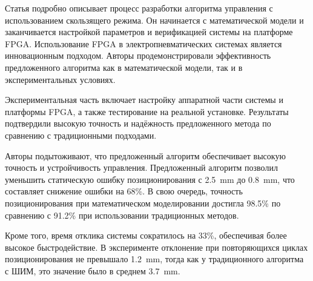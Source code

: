 Статья подробно описывает процесс разработки алгоритма управления с использованием скользящего режима.
Он начинается с математической модели и заканчивается настройкой параметров и верификацией системы на платформе FPGA.
Использование FPGA в электропневматических системах является инновационным подходом. Авторы продемонстрировали эффективность
предложенного алгоритма как в математической модели, так и в экспериментальных условиях.

Экспериментальная часть включает настройку аппаратной части системы и платформы FPGA, а также тестирование на реальной установке.
Результаты подтвердили высокую точность и надёжность предложенного метода по сравнению с традиционными подходами.

Авторы подытоживают, что предложенный алгоритм обеспечивает высокую точность и устройчивость управления.
Предложенный алгоритм позволил уменьшить статическую ошибку позиционирования с \num{2.5}~\si{\milli\metre} до \num{0.8}~\si{\milli\metre},
что составляет снижение ошибки на \num{68}\%.
В свою очередь, точность позиционирования при математическом моделировании достигла \num{98.5}\% по сравнению с \num{91.2}\% при
использовании традиционных методов.

Кроме того, время отклика системы сократилось на 33\%, обеспечивая более высокое быстродействие. В
эксперименте отклонение при повторяющихся циклах позиционирования не превышало \num{1.2}~\si{\milli\metre}, тогда как
у традиционного алгоритма с ШИМ, это значение было в среднем \num{3.7}~\si{\milli\metre}.

